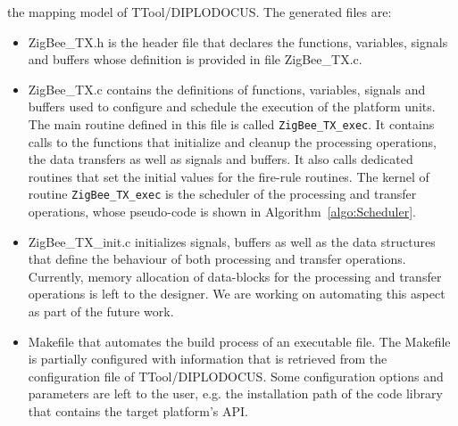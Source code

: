\documentclass{llncs}
\begin{document}
the mapping model of TTool/DIPLODOCUS. The generated files are:
%
\begin{itemize}
	\item ZigBee\_TX.h is the header file that declares the functions, variables, signals and buffers whose
	definition is provided in file ZigBee\_TX.c.
	\item ZigBee\_TX.c contains the definitions of functions, variables, signals and buffers used to configure and
	schedule the execution of the platform units. The main routine defined in this file is called
	\texttt{ZigBee\_TX\_exec}. It contains calls to the functions that initialize and cleanup the processing
	operations, the data transfers as well as signals and buffers. It also calls dedicated routines that set the
	initial values for the fire-rule routines. The kernel of routine \texttt{ZigBee\_TX\_exec} is the scheduler of
	the processing and transfer operations, whose pseudo-code is shown in Algorithm~\ref{algo:Scheduler}.
	\item ZigBee\_TX\_init.c initializes signals, buffers as well as the data structures that define the behaviour
	of both processing and transfer operations. Currently, memory allocation of data-blocks for the processing and
	transfer operations is left to the designer. We are working on automating this aspect as part of the future work.
	\item Makefile that automates the build process of an executable file. The Makefile is partially configured with
	information that is retrieved from the configuration file of TTool/DIPLODOCUS. Some configuration options and
	parameters are left to the user, e.g. the installation path of the code library that contains the target platform's
        API.
\end{itemize}
%
\end{document}
